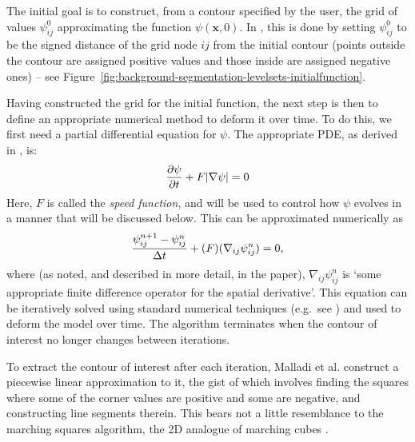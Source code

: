 The initial goal is to construct, from a contour specified by the user, the grid of values $\psi_{ij}^0$ approximating the function $\psi(\mathbf{x},0)$. In \cite{malladi95}, this is done by setting $\psi_{ij}^0$ to be the signed distance of the grid node $ij$ from the initial contour (points outside the contour are assigned positive values and those inside are assigned negative ones) -- see Figure~\ref{fig:background-segmentation-levelsets-initialfunction}.


Having constructed the grid for the initial function, the next step is then to define an appropriate numerical method to deform it over time. To do this, we first need a partial differential equation for $\psi$. The appropriate PDE, as derived in \cite{malladi95}, is:
%
\[
\frac{\partial \psi}{\partial t} + F|\nabla \psi| = 0
\]
%
Here, $F$ is called the \emph{speed function}, and will be used to control how $\psi$ evolves in a manner that will be discussed below. This can be approximated numerically as
%
\[
\frac{\psi_{ij}^{n+1} - \psi_{ij}^n}{\Delta t} + (F)(\nabla_{ij} \psi_{ij}^n) = 0,
\]
%
where (as noted, and described in more detail, in the paper), $\nabla_{ij} \psi_{ij}^n$ is `some appropriate finite difference operator for the spatial derivative'. This equation can be iteratively solved using standard numerical techniques (e.g.~see \cite{morton05}) and used to deform the model over time. The algorithm terminates when the contour of interest no longer changes between iterations.

To extract the contour of interest after each iteration, Malladi et al. construct a piecewise linear approximation to it, the gist of which involves finding the squares where some of the corner values are positive and some are negative, and constructing line segments therein. This bears not a little resemblance to the marching squares algorithm, the 2D analogue of marching cubes \cite{lorensen87}.

